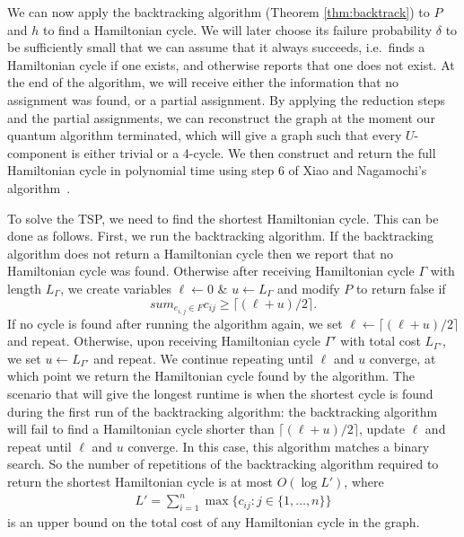 We can now apply the backtracking algorithm (Theorem \ref{thm:backtrack}) to $P$ and $h$ to find a Hamiltonian cycle. We will later choose its failure probability $\delta$ to be sufficiently small that we can assume that it always succeeds, i.e.\ finds a Hamiltonian cycle if one exists, and otherwise reports that one does not exist. At the end of the algorithm, we will receive either the information that no assignment was found, or a partial assignment. By applying the reduction steps and the partial assignments, we can reconstruct the graph at the moment our quantum algorithm terminated, which will give a graph such that every $U$-component is either trivial or a 4-cycle. We then construct and return the full Hamiltonian cycle in polynomial time using step $6$ of Xiao and Nagamochi's algorithm~\cite{xiao2016degree3}. %

To solve the TSP, we need to find the shortest Hamiltonian cycle. This can be done as follows. First, we run the backtracking algorithm. If the backtracking algorithm does not return a Hamiltonian cycle then we report that no Hamiltonian cycle was found. Otherwise after receiving Hamiltonian cycle $\Gamma$ with length $L_\Gamma$, we create variables $\ell \leftarrow 0$ \& $u \leftarrow L_\Gamma$ and modify $P$ to return false if
%
\begin{equation}
sum_{e_{i,j}\in F}c_{ij} \geq \lceil(\ell + u)/2\rceil.
\end{equation}
%
If no cycle is found after running the algorithm again, we set $\ell \leftarrow \lceil(\ell + u)/2\rceil$ and repeat. Otherwise, upon receiving Hamiltonian cycle $\Gamma'$ with total cost $L_{\Gamma'}$, we set $u \leftarrow L_{\Gamma'}$ and repeat. We continue repeating until $\ell$ and $u$ converge, at which point we return the Hamiltonian cycle found by the algorithm. The scenario that will give the longest runtime is when the shortest cycle is found during the first run of the backtracking algorithm: the backtracking algorithm will fail to find a Hamiltonian cycle shorter than $\lceil(\ell + u)/2\rceil$, update $\ell$ and repeat until $\ell$ and $u$ converge. In this case, this algorithm matches a binary search. So the number of repetitions of the backtracking algorithm required to return the shortest Hamiltonian cycle is at most $O(\log L')$, where
%
%
\begin{align}
L' = \sum_{i = 1}^{n}\max \{c_{ij} : j \in \{1,\dots,n\} \}
\label{eqn:l}
\end{align}
%
is an upper bound on the total cost of any Hamiltonian cycle in the graph.


